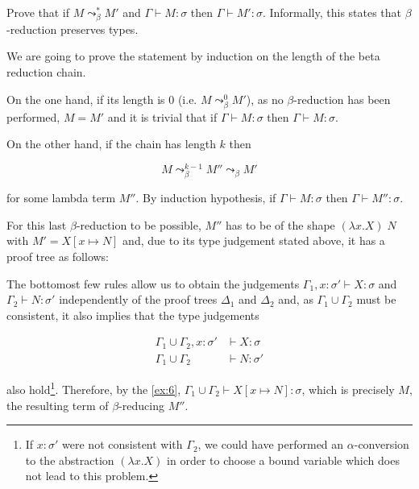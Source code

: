 \documentclass{article}
\begin{document}
\subsection{}\label{ex:7}

Prove that if $M \leadsto^{*}_{\beta} M'$ and 
$\Gamma \vdash M: \sigma$ then 
$\Gamma \vdash M': \sigma$. Informally, this states that 
$\beta$-reduction preserves types.

We are going to prove the statement by induction on the length of the
beta reduction chain.

On the one hand, if its length is $0$ (i.e. $M \leadsto^{0}_{\beta} M'$),
as no $\beta$-reduction has been performed, $M = M'$ and it is trivial that
if $\Gamma \vdash M: \sigma$ then $\Gamma \vdash M: \sigma$.

On the other hand, if the chain has length $k$ then 

$$M \leadsto^{k - 1}_{\beta} M'' \leadsto_{\beta} M'$$

for some lambda term $M''$. By induction hypothesis, if 
$\Gamma \vdash M: \sigma$ then $\Gamma \vdash M'': \sigma$.

For this last $\beta$-reduction to be possible, $M''$ has to be 
of the shape $(\lambda x. X)\;N$ with $M' = X[x \mapsto N]$ and, 
due to its type judgement stated above, it has a proof tree as 
follows:

\begin{mathpar}
\end{mathpar}

The bottomost few rules allow us to obtain the judgements
$\Gamma_1, x: \sigma' \vdash X: \sigma$ and $\Gamma_2 \vdash N: \sigma'$ 
independently of the proof trees $\Delta_1$ and $\Delta_2$
and, as $\Gamma_1 \cup \Gamma_2$ must be consistent, it also implies that 
the type judgements

\begin{align*}
  \Gamma_1 \cup \Gamma_2, x: \sigma' &\vdash X: \sigma \\
  \Gamma_1 \cup \Gamma_2 &\vdash N: \sigma'
\end{align*}

also hold\footnote{
  If $x: \sigma'$ were not consistent with $\Gamma_2$, we could 
  have performed an $\alpha$-conversion to the abstraction 
  $(\lambda x. X)$ in order to choose a bound variable which does 
  not lead to this problem.
}. Therefore, by the \ref{ex:6}, 
$\Gamma_1 \cup \Gamma_2 \vdash X[x \mapsto N] : \sigma$, which is precisely
$M$, the resulting term of $\beta$-reducing $M''$.
\end{document}
